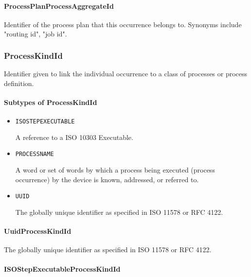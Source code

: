 \paragraph{ProcessPlanProcessAggregateId}\mbox{}
\label{sec:ProcessPlanProcessAggregateId}


Identifier of the process plan that this occurrence belongs to. Synonyms include "routing id", "job id".



\subsubsection{ProcessKindId}
\label{sec:ProcessKindId}



Identifier given to link the individual occurrence to a class of processes or process definition.



\paragraph{Subtypes of ProcessKindId}\mbox{}
\label{sec:Subtypes of ProcessKindId}

\begin{itemize}

\item \texttt{ISO\textunderscore STEP\textunderscore EXECUTABLE}


A reference to a ISO 10303 Executable.

\item \texttt{PROCESS\textunderscore NAME}


A word or set of words by which a process being executed (process occurrence) by the device is known, addressed, or referred to.


\item \texttt{UUID}


The globally unique identifier as specified in ISO 11578 or RFC 4122.


\end{itemize}

\paragraph{UuidProcessKindId}\mbox{}
\label{sec:UuidProcessKindId}


The globally unique identifier as specified in ISO 11578 or RFC 4122.


\paragraph{ISOStepExecutableProcessKindId}\mbox{}
\label{sec:ISOStepExecutableProcessKindId}


